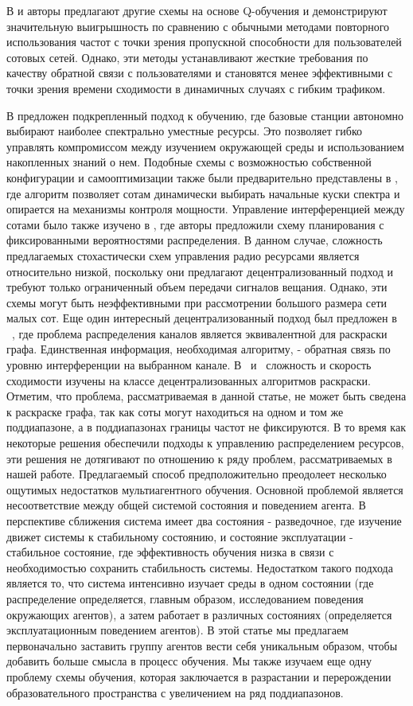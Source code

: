 В \cite{mp-qlearning} и \cite{fzq-learning} авторы предлагают другие схемы на основе Q-обучения и демонстрируют значительную выигрышность по сравнению с обычными методами повторного использования частот с точки зрения пропускной способности для пользователей сотовых сетей. Однако, эти методы устанавливают жесткие требования по качеству обратной связи с пользователями и становятся менее эффективными с точки зрения времени сходимости в динамичных случаях с гибким трафиком. 

В \cite{mab} предложен подкрепленный подход к обучению, где базовые станции автономно выбирают наиболее спектрально уместные ресурсы. Это позволяет гибко управлять компромиссом между изучением окружающей среды и использованием накопленных знаний о нем. Подобные схемы с возможностью собственной конфигурации и самооптимизации также были предварительно представлены в \cite{local-area}, где алгоритм позволяет сотам динамически выбирать начальные куски спектра и опирается на механизмы контроля мощности. Управление интерференцией между сотами было также изучено в \cite{on-uplink}, где авторы предложили схему планирования с фиксированными вероятностями распределения. В данном случае, сложность предлагаемых стохастически схем управления радио ресурсами является относительно низкой, поскольку они предлагают децентрализованный подход и требуют только ограниченный объем передачи сигналов вещания. Однако, эти схемы могут быть неэффективными при рассмотрении большого размера сети малых сот.
Еще один интересный децентрализованный подход был предложен в ~\cite{1666484}, где проблема распределения каналов является эквивалентной для раскраски графа. Единственная информация, необходимая алгоритму, - обратная связь по уровню интерференции на выбранном канале. В~\cite{Duffy:2008:CAD:1377038.1377164} и ~\cite{4177619}сложность и скорость сходимости изучены на классе децентрализованных алгоритмов раскраски. Отметим, что проблема, рассматриваемая в данной статье, не может быть сведена к раскраске графа, так как соты могут находиться на одном и том же поддиапазоне, а в поддиапазонах границы частот не фиксируются.
В то время как некоторые решения обеспечили подходы к управлению распределением ресурсов, эти решения не дотягивают по отношению к ряду проблем, рассматриваемых в нашей работе. Предлагаемый способ предположительно преодолеет несколько ощутимых недостатков мультиагентного обучения. Основной проблемой является несоответствие между общей системой состояния и поведением агента. В перспективе сближения система имеет два состояния - разведочное, где изучение движет системы к стабильному состоянию, и состояние эксплуатации - стабильное состояние, где эффективность обучения низка в связи с необходимостью сохранить стабильность системы. Недостатком такого подхода является то, что система интенсивно изучает среды в одном состоянии (где распределение определяется, главным образом, исследованием поведения окружающих агентов), а затем работает в различных состояниях (определяется эксплуатационным поведением агентов). В этой статье мы предлагаем первоначально заставить группу агентов вести себя уникальным образом, чтобы добавить больше смысла в процесс обучения. Мы также изучаем еще одну проблему схемы обучения, которая заключается в разрастании и перерождении образовательного пространства с увеличением на ряд поддиапазонов.
